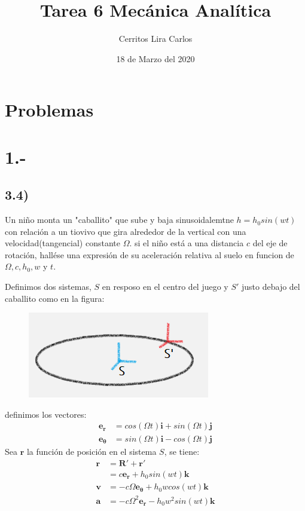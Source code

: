 \documentclass{article}
\title{Tarea 6 Mecánica Analítica}
\author{Cerritos Lira Carlos}
\date{18 de Marzo del 2020}
\begin{document}
\maketitle
\section*{Problemas}
\section*{1.-}
\subsection*{3.4)}
Un niño monta un "caballito" que sube y baja sinusoidalemtne $h=h_0sin(wt)$ con 
relación a un tiovivo que gira alrededor de la vertical con una velocidad(tangencial)
constante $\Omega$. si el niño está a una distancia $c$ del eje de rotación, 
hallése una expresión de su aceleración relativa al suelo en funcion de $\Omega, c, h_0, w$ 
y $t$. 
\begin{tcolorbox}[breakable]
    Definimos dos sistemas, $S$ en resposo en el centro del juego y $S'$ justo debajo del 
    caballito como en la figura:
    \begin{figure}[H]
        \centering
        \includegraphics[]{p1_horse.png}
    \end{figure}
    definimos los vectores:
    \begin{align*}
        \bm{e_r} &= cos(\Omega t) \bm{i} + sin(\Omega t) \bm{j} \\ 
        \bm{e_\theta} &= sin(\Omega t)\bm{i} - cos(\Omega t) \bm{j}
    \end{align*}
    Sea $\bm{r}$ la función de posición en el sistema $S$, se tiene:
    \begin{align*}
        \bm{r} 
        &= \bm{R'} + \bm{r'} \\
        &= c\bm{e_r} + h_0sin(wt)\bm{k} \\
        \bm{v} &= -c\Omega\bm{e_\theta} + h_0wcos(wt)\bm{k} \\
        \bm{a} &= -c\Omega^2\bm{e_r} - h_0w^2sin(wt)\bm{k} \\
    \end{align*}
\end{tcolorbox}
\end{document}
